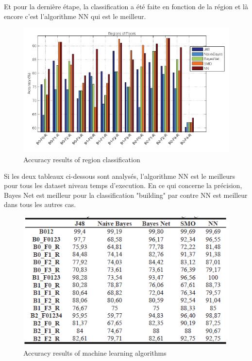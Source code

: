 Et pour la dernière étape, la classification a été faite en fonction de la région et là encore c'est l'algorithme NN qui est le meilleur.

\begin{figure}[H]
	\begin{center}
		\includegraphics[scale=1]{figures/regionClassification.png}
		\caption{Accuracy results of region classification}
		\label{fig:regionClass} %
	\end{center}
\end{figure}

Si les deux tableaux ci-dessous sont analysés, l'algorithme NN est le meilleurs pour tous les dataset niveau temps d'execution. En ce qui concerne la précision, Bayes Net est meilleur pour la classification "building" par contre NN est meilleur dans tous les autres cas.

\begin{figure}[H]
	\begin{center}
		\includegraphics[scale=1]{figures/accuracy.png}
		\caption{Accuracy results of machine learning algorithms}
		\label{fig:accuracy} %
	\end{center}
\end{figure}

